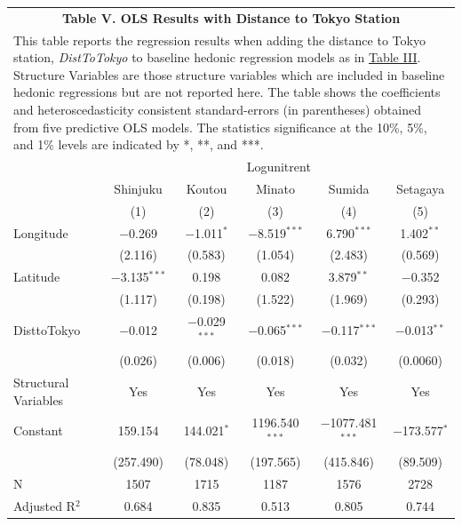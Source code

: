 \documentclass[a4paper, 12pt]{article} %
\newcommand{\var}[1][\textit]{#1}
\begin{document}
\begin{table}[!htbp] \centering 
\label{tb5}
\begin{tabular}{p{2.1cm}ccccc}
\multicolumn{6}{c}{\textbf{Table V. OLS Results with Distance to Tokyo Station}} \\
\multicolumn{6}{p{14.5cm}}{This table reports the regression results when adding the distance to Tokyo station, \var{DistToTokyo} to baseline hedonic regression models as in \hyperref[tb3]{Table III}. Structure Variables are those structure variables which are included in baseline hedonic regressions but are not reported here. The table shows the coefficients and heteroscedasticity consistent standard-errors (in parentheses) obtained from five predictive OLS models. The statistics significance at the 10\%, 5\%, and 1\% levels are indicated by *, **, and ***.} \\
\hline
& \multicolumn{5}{c}{Logunitrent} \\
& Shinjuku & Koutou & Minato & Sumida & Setagaya \\
& (1) & (2) & (3) & (4) & (5) \\
\hline
\addlinespace[0.5em]
Longitude & $-$0.269 & $-$1.011$^{*}$ & $-$8.519$^{***}$ & 6.790$^{***}$ & 1.402$^{**}$ \\
& (2.116) & (0.583) & (1.054) & (2.483) & (0.569) \\
\addlinespace[0.5em]
Latitude & $-$3.135$^{***}$ & 0.198 & 0.082 & 3.879$^{**}$ & $-$0.352 \\
& (1.117) & (0.198) & (1.522) & (1.969) & (0.293) \\
\addlinespace[0.5em]
DisttoTokyo & $-$0.012 & $-$0.029$^{***}$ & $-$0.065$^{***}$ & $-$0.117$^{***}$ & $-$0.013$^{**}$ \\
& (0.026) & (0.006) & (0.018) & (0.032) & (0.0060) \\
\addlinespace[0.5em]
Structural Variables & Yes & Yes & Yes & Yes & Yes \\
\addlinespace[0.5em]
Constant & 159.154 & 144.021$^{*}$ & 1196.540$^{***}$ & $-$1077.481$^{***}$ & $-$173.577$^{*}$ \\
& (257.490) & (78.048) & (197.565) & (415.846) & (89.509) \\
\addlinespace[0.5em]
N & 1507 & 1715 & 1187 & 1576 & 2728 \\
Adjusted R$^2$ & 0.684 & 0.835 & 0.513 & 0.805 & 0.744 \\ 
\hline

\end{tabular}
\end{table}
\end{document}

